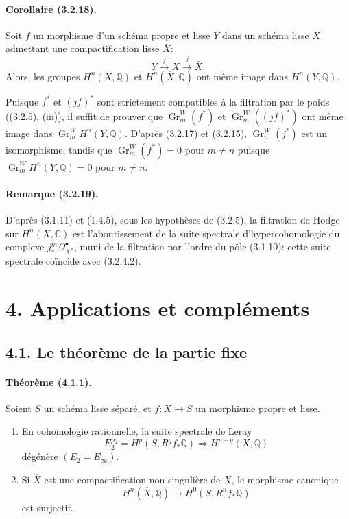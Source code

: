 \documentclass[10pt]{article}
\newcommand{\C}{\mathbb C}
\newcommand{\Q}{\mathbb Q}
\newcommand{\Gr}{\operatorname{Gr}}
\begin{document}
\paragraph{Corollaire (3.2.18).} Soit $f$ un morphisme d'un schéma propre et lisse $Y$ dans un schéma lisse $X$ admettant une compactification lisse $\overline X$:
\[
Y\xrightarrow{f}X\xrightarrow{j}\overline X.
\]
Alors, les groupes $H^n(X,\Q)$ et $H^n(\overline X,\Q)$ ont même image dans $H^n(Y,\Q)$.

Puisque $f^*$ et $(jf)^*$ sont strictement compatibles à la filtration par le poids ((3.2.5), (iii)), il suffit de prouver que $\Gr_m^W(f^*)$ et $\Gr_m^W((jf)^*)$ ont même image dans $\Gr_m^W H^n(Y,\Q)$. D'après (3.2.17) et (3.2.15), $\Gr_n^W(j^*)$ est un isomorphisme, tandis que $\Gr_m^W(f^*)=0$ pour $m\ne n$ puisque $\Gr_m^W H^n(Y,\Q)=0$ pour $m\ne n$.

\paragraph{Remarque (3.2.19).} D'après (3.1.11) et (1.4.5), sous les hypothèses de (3.2.5), la filtration de Hodge sur $H^n(X,\C)$ est l'aboutissement de la suite spectrale d'hypercohomologie du complexe $j_*^m\Omega_{X^*}^{\bullet}$, muni de la filtration par l'ordre du pôle (3.1.10): cette suite spectrale coïncide avec (3.2.4.2).

\section*{4. Applications et compléments}

\subsection*{4.1. Le théorème de la partie fixe}

\paragraph{Théorème (4.1.1).} Soient $S$ un schéma lisse séparé, et $f:X\to S$ un morphisme propre et lisse.
\begin{enumerate}[label=(\roman*)]
\item En cohomologie rationnelle, la suite spectrale de Leray
\[
E_2^{pq}=H^p(S,R^qf_*\Q)\Longrightarrow H^{p+q}(X,\Q)
\]
dégénère $(E_2=E_\infty)$.
\item Si $\overline X$ est une compactification non singulière de $X$, le morphisme canonique
\[
H^n(\overline X,\Q)\longrightarrow H^0(S,R^nf_*\Q)
\]
est surjectif.
\end{enumerate}
\end{document}
